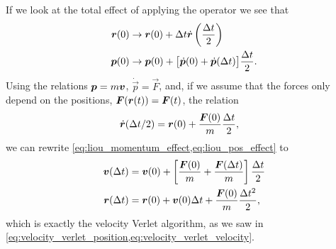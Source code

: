 If we look at the total effect of applying the operator we see that
\begin{align}
    \boldsymbol{r}(0)
    &\rightarrow \boldsymbol{r}(0) + \Delta t \dot{\boldsymbol{r}}\left(\frac{\Delta t}{2}\right) \label{eq:liou_pos_effect} \\
    \boldsymbol{p}(0) 
    &\rightarrow \boldsymbol{p}(0) + \big[\dot{\boldsymbol{p}}(0) + \dot{\boldsymbol{p}}(\Delta t) \big] \frac{\Delta t}{2} \label{eq:liou_momentum_effect}.
\end{align}
Using the relations $\boldsymbol{p} = m\boldsymbol{v}$, $\dot{\vec p} = \vec F$, and, if we assume that the forces only depend on the positions, $\boldsymbol{F}(\boldsymbol{r}(t)) = \boldsymbol{F}(t)$, the relation 
\begin{align*}
    &\dot{\boldsymbol{r}}(\Delta t/2) = \boldsymbol{r}(0) + \frac{\boldsymbol{F}(0)}{m} \frac{\Delta t}{2},
\end{align*}
we can rewrite \cref{eq:liou_momentum_effect,eq:liou_pos_effect} to
\begin{align*}
    \boldsymbol{v}(\Delta t) &= \boldsymbol{v}(0) + \left[\frac{\boldsymbol{F}(0)}{m} + \frac{\boldsymbol{F}(\Delta t)}{m}\right] \frac{\Delta t}{2} \\
    \boldsymbol{r}(\Delta t) &= \boldsymbol{r}(0) + \boldsymbol{v}(0)\Delta t + \frac{\boldsymbol{F}(0)}{m}\frac{\Delta t^2}{2},
\end{align*}
which is exactly the velocity Verlet algorithm, as we saw in \cref{eq:velocity_verlet_position,eq:velocity_verlet_velocity}.

